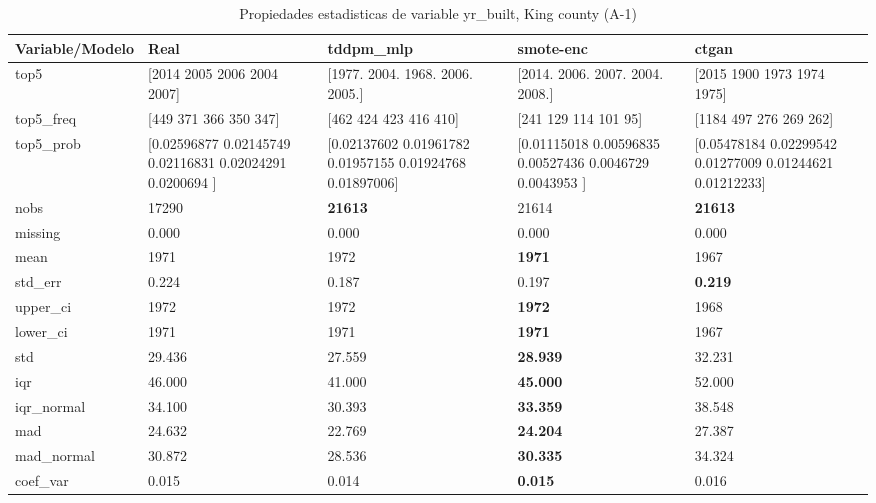 \begin{table}[H]
\centering
\fontsize{8}{14}\selectfont
\caption{Propiedades  estadisticas de variable yr\_built, King county (A-1)}
\label{table-stats-king county-a-1-yr_built}
\begin{tabular}{|l|m{10em}|m{10em}|m{10em}|m{10em}|}
\hline
 \rowcolor[gray]{0.8}
Variable/Modelo & Real & tddpm\_mlp & smote-enc & ctgan \\
\hline top5 & [2014 2005 2006 2004 2007] & [1977. 2004. 1968. 2006. 2005.] & [2014. 2006. 2007. 2004. 2008.] & [2015 1900 1973 1974 1975] \\
\hline top5\_freq & [449 371 366 350 347] & [462 424 423 416 410] & [241 129 114 101  95] & [1184  497  276  269  262] \\
\hline top5\_prob & [0.02596877 0.02145749 0.02116831 0.02024291 0.0200694 ] & [0.02137602 0.01961782 0.01957155 0.01924768 0.01897006] & [0.01115018 0.00596835 0.00527436 0.0046729  0.0043953 ] & [0.05478184 0.02299542 0.01277009 0.01244621 0.01212233] \\
\hline nobs & 17290 & \bfseries 21613 & \cellcolor[rgb]{0.9, 0.54, 0.52} 21614 & \bfseries 21613 \\
\hline missing & 0.000 & 0.000 & 0.000 & 0.000 \\
\hline mean & 1971 & 1972 & \bfseries 1971 & \cellcolor[rgb]{0.9, 0.54, 0.52} 1967 \\
\hline std\_err & 0.224 & \cellcolor[rgb]{0.9, 0.54, 0.52} 0.187 & 0.197 & \bfseries 0.219 \\
\hline upper\_ci & 1972 & 1972 & \bfseries 1972 & \cellcolor[rgb]{0.9, 0.54, 0.52} 1968 \\
\hline lower\_ci & 1971 & 1971 & \bfseries 1971 & \cellcolor[rgb]{0.9, 0.54, 0.52} 1967 \\
\hline std & 29.436 & 27.559 & \bfseries 28.939 & \cellcolor[rgb]{0.9, 0.54, 0.52} 32.231 \\
\hline iqr & 46.000 & 41.000 & \bfseries 45.000 & \cellcolor[rgb]{0.9, 0.54, 0.52} 52.000 \\
\hline iqr\_normal & 34.100 & 30.393 & \bfseries 33.359 & \cellcolor[rgb]{0.9, 0.54, 0.52} 38.548 \\
\hline mad & 24.632 & 22.769 & \bfseries 24.204 & \cellcolor[rgb]{0.9, 0.54, 0.52} 27.387 \\
\hline mad\_normal & 30.872 & 28.536 & \bfseries 30.335 & \cellcolor[rgb]{0.9, 0.54, 0.52} 34.324 \\
\hline coef\_var & 0.015 & 0.014 & \bfseries 0.015 & \cellcolor[rgb]{0.9, 0.54, 0.52} 0.016 \\

\end{tabular}
\end{table}
